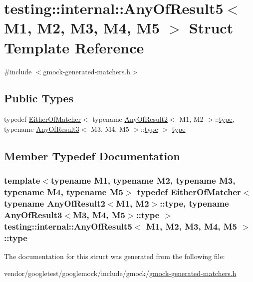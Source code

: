 \hypertarget{structtesting_1_1internal_1_1AnyOfResult5}{}\section{testing\+:\+:internal\+:\+:Any\+Of\+Result5$<$ M1, M2, M3, M4, M5 $>$ Struct Template Reference}
\label{structtesting_1_1internal_1_1AnyOfResult5}


{\ttfamily \#include $<$gmock-\/generated-\/matchers.\+h$>$}

\subsection*{Public Types}
\begin{DoxyCompactItemize}
\item 
typedef \hyperlink{classtesting_1_1internal_1_1EitherOfMatcher}{Either\+Of\+Matcher}$<$ typename \hyperlink{structtesting_1_1internal_1_1AnyOfResult2}{Any\+Of\+Result2}$<$ M1, M2 $>$\+::\hyperlink{structtesting_1_1internal_1_1AnyOfResult5_a459a06dc5791313dce942668714f0c99}{type}, typename \hyperlink{structtesting_1_1internal_1_1AnyOfResult3}{Any\+Of\+Result3}$<$ M3, M4, M5 $>$\+::\hyperlink{structtesting_1_1internal_1_1AnyOfResult5_a459a06dc5791313dce942668714f0c99}{type} $>$ \hyperlink{structtesting_1_1internal_1_1AnyOfResult5_a459a06dc5791313dce942668714f0c99}{type}
\end{DoxyCompactItemize}


\subsection{Member Typedef Documentation}
\subsubsection[{\texorpdfstring{type}{type}}]{\setlength{\rightskip}{0pt plus 5cm}template$<$typename M1, typename M2, typename M3, typename M4, typename M5$>$ typedef {\bf Either\+Of\+Matcher}$<$ typename {\bf Any\+Of\+Result2}$<$M1, M2$>$\+::{\bf type}, typename {\bf Any\+Of\+Result3}$<$M3, M4, M5$>$\+::{\bf type} $>$ {\bf testing\+::internal\+::\+Any\+Of\+Result5}$<$ M1, M2, M3, M4, M5 $>$\+::{\bf type}}\hypertarget{structtesting_1_1internal_1_1AnyOfResult5_a459a06dc5791313dce942668714f0c99}{}\label{structtesting_1_1internal_1_1AnyOfResult5_a459a06dc5791313dce942668714f0c99}


The documentation for this struct was generated from the following file\+:\begin{DoxyCompactItemize}
\item 
vendor/googletest/googlemock/include/gmock/\hyperlink{gmock-generated-matchers_8h}{gmock-\/generated-\/matchers.\+h}\end{DoxyCompactItemize}
